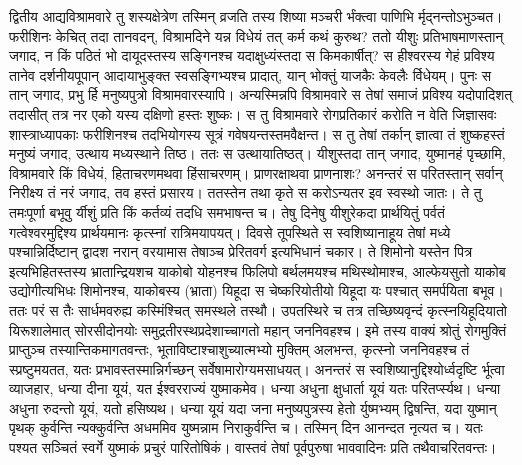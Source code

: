 \adhyAya
\vspace{25pt}
\vakya द्वितीय आद्यविश्रामवारे तु शस्यक्षेत्रेण तस्मिन् व्रजति तस्य शिष्या मञ्चरी र्भंक्त्वा पाणिभि र्मृद्नन्तोऽभुञ्चत।
\vakya फरीशिनः केचित् तदा तानवदन्, विश्रामदिने यन्न विधेयं तत् कर्म कथं कुरुथ?
\vakya ततो यीशुः प्रतिभाषमाणस्तान् जगाद, न किं पठितं भो दायूदस्तस्य सङ्गिनश्च यदाक्षुध्यंस्तदा स किमकार्षीत्?
\vakya स हीश्वरस्य गेहं प्रविश्य तानेव दर्शनीयपूपान् आदायाभुङ्क्त स्वसङ्गिभ्यश्च प्रादात्, यान् भोक्तुं याजकैः केवलैः र्विधेयम्।
\vakya पुनः स तान् जगाद, प्रभु र्हि मनुष्यपुत्रो विश्रामवारस्यापि।
\vakya अन्यस्मिन्नपि विश्रामवारे स तेषां समाजं प्रविश्य यदोपादिशत् तदासीत् तत्र नर एको यस्य दक्षिणो हस्तः शुष्कः।
\vakya स तु विश्रामवारे रोगप्रतिकारं करोति न वेति जिज्ञासवः शास्त्राध्यापकाः फरीशिनश्च तदभियोगस्य सूत्रं गवेषयन्तस्तमवैक्षन्त।
\vakya स तु तेषां तर्कान् ज्ञात्वा तं शुष्कहस्तं मनुष्यं जगाद, उत्थाय मध्यस्थाने तिष्ठ। ततः स उत्थायातिष्ठत्।
\vakya यीशुस्तदा तान् जगाद, युष्मानहं पृच्छामि, विश्रामवारे किं विधेयं, हिताचरणमथवा हिंसाचरणम्। प्राणरक्षाथवा प्राणनाशः?
\vakya अनन्तरं स परितस्तान् सर्वान् निरीक्ष्य तं नरं जगाद, तव हस्तं प्रसारय। ततस्तेन तथा कृते स करोऽन्यतर इव स्वस्थो जातः।
\vakya ते तु तमःपूर्णा बभूवु र्यीशुं प्रति किं कर्तव्यं तदधि समभाषन्त च।
\vakya तेषु दिनेषु यीशुरेकदा प्रार्थयितुं पर्वतं गत्वेश्वरमुद्दिश्य प्रार्थयमानः कृत्स्नां रात्रिमयापयत्।
\vakya दिवसे तूपस्थिते स स्वशिष्यानाहूय तेषां मध्ये पश्चान्निर्दिष्टान् द्वादश नरान् वरयामास तेषाञ्च प्रेरितवर्ग इत्यभिधानं चकार।
\vakya ते शिमोनो यस्तेन पित्र इत्यभिहितस्तस्य भ्रातान्द्रियशच याकोबो योहनश्च फिलिपो बर्थलमयश्च
\vakya मथिस्थोमाश्च, आल्फेयसुतो याकोब उद्योगीत्यभिधः शिमोनश्च,
\vakya याकोबस्य (भ्राता) यिहूदा स चेष्करियोतीयो यिहूदा यः पश्चात् समर्पयिता बभूव।
\vakya ततः परं स तैः सार्धमवरुह्य कस्मिंश्चित् समस्थले तस्थौ। उपतस्थिरे च तत्र तच्छिष्यवृन्दं कृत्स्नयिहूदियातो यिरूशालेमात् सोरसीदोनयोः समुद्रतीरस्थप्रदेशाच्चागतो महान् जननिवहश्च।
\vakya इमे तस्य वाक्यं श्रोतुं रोगमुक्तिं प्राप्तुञ्च तस्यान्तिकमागतवन्तः, भूताविष्टाश्चाशुच्यात्मभ्यो मुक्तिम् अलभन्त,
\vakya कृत्स्नो जननिवहश्च तं स्प्रष्टुमयतत, यतः प्रभावस्तस्मान्निर्गच्छन् सर्वेषामारोग्यमसाधयत्।
\vakya अनन्तरं स स्वशिष्यानुद्दिश्योर्ध्वदृष्टि र्भूत्वा व्याजहार, धन्या दीना यूयं, यत ईश्वरराज्यं युष्माकमेव।
\vakya धन्या अधुना क्षुधार्ता यूयं यतः परितर्प्स्यथ। धन्या अधुना रुदन्तो यूयं, यतो हसिष्यथ।
\vakya धन्या यूयं यदा जना मनुष्यपुत्रस्य हेतो र्युष्मभ्यम् द्विषन्ति, यदा युष्मान् पृथक् कुर्वन्ति न्यक्कुर्वन्ति अधममिव युष्मन्नाम निराकुर्वन्ति च।
\vakya तस्मिन् दिन आनन्दत नृत्यत च। यतः पश्यत सञ्चितं स्वर्गे युष्माकं प्रचुरं पारितोषिकं। वास्तवं तेषां पूर्वपुरुषा भाववादिनः प्रति तथैवाचरितवन्तः।
